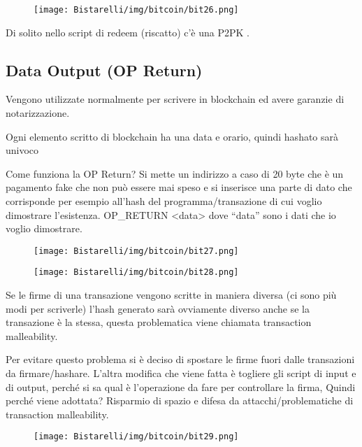 \begin{figure}[H]
	\centering
    \texttt{[image: Bistarelli/img/bitcoin/bit26.png]}
\end{figure}

Di solito nello script di redeem (riscatto) c’è una P2PK .

\subsection{Data Output (OP Return)}

Vengono utilizzate normalmente per scrivere in blockchain ed avere garanzie di notarizzazione.

\singlespacing

Ogni elemento scritto di blockchain ha una data e orario, quindi hashato sarà univoco

\singlespacing

Come funziona la OP Return? Si mette un indirizzo a caso di 20 byte che è un pagamento fake che non può
essere mai speso e si inserisce una parte di dato che corrisponde per esempio all’hash del programma/transazione
di cui voglio dimostrare l’esistenza. OP\_RETURN <data> dove “data” sono i dati che io voglio dimostrare.

\begin{figure}[H]
	\centering
    \texttt{[image: Bistarelli/img/bitcoin/bit27.png]}
\end{figure}

\begin{figure}[H]
	\centering
    \texttt{[image: Bistarelli/img/bitcoin/bit28.png]}
\end{figure}

Se le firme di una transazione vengono scritte in maniera diversa (ci sono più modi per scriverle) l’hash generato
sarà ovviamente diverso anche se la transazione è la stessa, questa problematica viene chiamata transaction
malleability.

\singlespacing

Per evitare questo problema si è deciso di spostare le firme fuori dalle transazioni da firmare/hashare. L’altra
modifica che viene fatta è togliere gli script di input e di output, perché si sa qual è l’operazione da fare per
controllare la firma,
Quindi perché viene adottata? Risparmio di spazio e difesa da attacchi/problematiche di transaction malleability.

\begin{figure}[H]
	\centering
    \texttt{[image: Bistarelli/img/bitcoin/bit29.png]}
\end{figure}

